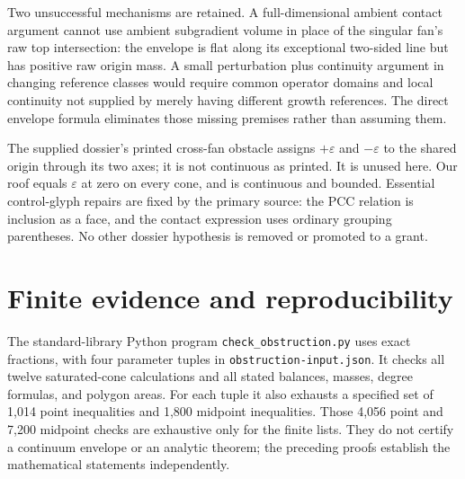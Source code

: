 \documentclass[11pt]{article}
\newcommand{\eps}{\varepsilon}
\begin{document}
Two unsuccessful mechanisms are retained. A full-dimensional ambient contact argument cannot use ambient subgradient volume in place of the singular fan's raw top intersection: the envelope is flat along its exceptional two-sided line but has positive raw origin mass. A small perturbation plus continuity argument in changing reference classes would require common operator domains and local continuity not supplied by merely having different growth references. The direct envelope formula eliminates those missing premises rather than assuming them.

The supplied dossier's printed cross-fan obstacle assigns $+\eps$ and $-\eps$ to the shared origin through its two axes; it is not continuous as printed. It is unused here. Our roof equals $\eps$ at zero on every cone, and is continuous and bounded. Essential control-glyph repairs are fixed by the primary source: the PCC relation is inclusion as a face, and the contact expression uses ordinary grouping parentheses. No other dossier hypothesis is removed or promoted to a grant.

\section{Finite evidence and reproducibility}
The standard-library Python program \texttt{check\_obstruction.py} uses exact fractions, with four parameter tuples in \texttt{obstruction-input.json}. It checks all twelve saturated-cone calculations and all stated balances, masses, degree formulas, and polygon areas. For each tuple it also exhausts a specified set of 1,014 point inequalities and 1,800 midpoint inequalities. Those 4,056 point and 7,200 midpoint checks are exhaustive only for the finite lists. They do not certify a continuum envelope or an analytic theorem; the preceding proofs establish the mathematical statements independently.
\end{document}
